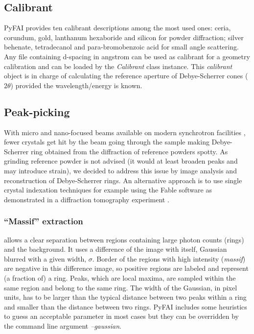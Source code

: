 \documentclass[preprint]{iucr}
\begin{document}
\subsection{Calibrant}
PyFAI provides ten calibrant descriptions among the most used ones: ceria,
corundum, gold, lanthanum hexaboride and silicon for powder diffraction;
silver behenate, tetradecanol and para-bromobenzoic acid for small angle scattering.
Any file containing d-spacing in angstrom can be used as calibrant for a
geometry calibration and can be loaded by the \textit{Calibrant} class instance.
This \textit{calibrant} object is in charge of
calculating the reference aperture of Debye-Scherrer cones ($2\theta$) provided the
wavelength/energy is known.

\subsection{Peak-picking}
With micro and nano-focused beams available on modern synchrotron facilities
\cite{id13}, fewer crystals get hit by the beam going through the
sample making Debye-Scherrer ring obtained from the diffraction of reference
powders spotty.
As grinding reference powder is not advised (it would at least broaden peaks
and may introduce strain), we decided to
address this issue by image analysis and reconstruction of Debye-Scherrer rings.
An alternative approach is to use single crystal indexation techniques for
example using the Fable software \cite{fable} as demonstrated in a diffraction
tomography experiment \cite{bonnin}.

\subsubsection{``Massif'' extraction}
\label{massif}
allows a clear separation between regions containing large
photon counts (rings) and the background.
It uses a difference of the image with itself, Gaussian blurred with a given
width, $\sigma$.
Border of the regions with high intensity (\textit{massif}) are negative in this
difference image, so positive regions are labeled and represent
(a fraction of) a ring. Peaks, which are local maxima,
are sampled within the same region and belong to the same ring.
The width of the Gaussian, in pixel units, has to be larger than the typical
distance between two peaks within a ring and smaller than the distance between two
rings.
PyFAI includes some heuristics to guess an acceptable parameter in most cases
but they can be overridden by the command line argument \textit{--gaussian}.
\end{document}

